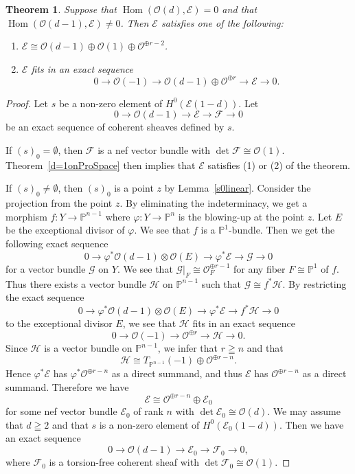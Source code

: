 \documentclass[a4paper,12pt]{amsart}
\newtheorem{thm}{Theorem}[section]
\DeclareMathOperator{\Hom}{Hom}
\begin{document}
\begin{thm}\label{oneO(d-1)}
Suppose that $\Hom(\mathcal{O}(d),\mathcal{E})=0$
and that $\Hom(\mathcal{O}(d-1),\mathcal{E})\neq 0$.
Then $\mathcal{E}$ satisfies one of the following:
\begin{enumerate}
\item $\mathcal{E}\cong \mathcal{O}(d-1)\oplus \mathcal{O}(1)\oplus \mathcal{O}^{\oplus r-2}$.
\item $\mathcal{E}$ fits in an exact sequence
\[
0\to \mathcal{O}(-1)\to \mathcal{O}(d-1)\oplus \mathcal{O}^{\oplus r}\to \mathcal{E}\to 0.
\]
\end{enumerate}
\end{thm}
\begin{proof}
Let $s$ be a non-zero element of $H^0(\mathcal{E}(1-d))$.
Let 
\[0\to \mathcal{O}(d-1)\to \mathcal{E}\to \mathcal{F}\to 0\]
be an exact sequence of coherent sheaves
defined by $s$.

If $(s)_0=\emptyset$, then $\mathcal{F}$ is a nef vector bundle with $\det\mathcal{F}\cong \mathcal{O}(1)$.
Theorem~\ref{d=1onProSpace} then implies that $\mathcal{E}$ satisfies (1) or (2) of the theorem.

If $(s)_0\neq \emptyset$, then $(s)_0$ is a point $z$ by Lemma~\ref{s0linear}.
Consider the projection from 
the point $z$.
By eliminating the indeterminacy, we get a morphism $f:Y\to \mathbb{P}^{n-1}$ where $\varphi:Y\to \mathbb{P}^n$
is the blowing-up 
at the point $z$.
Let $E$ be the exceptional divisor of $\varphi$.
We see that $f$ is a $\mathbb{P}^{1}$-bundle.
Then we get the following exact sequence
\[0\to\varphi^*\mathcal{O}(d-1)\otimes\mathcal{O}(E)\to \varphi^*\mathcal{E}\to \mathcal{G}\to 0\]
for a vector bundle $\mathcal{G}$ on $Y$.
We see that $\mathcal{G}|_F\cong \mathcal{O}_F^{\oplus r-1}$ for any fiber $F\cong \mathbb{P}^{1}$ of $f$.
Thus there exists a vector bundle $\mathcal{H}$ on $\mathbb{P}^{n-1}$ such that $\mathcal{G}\cong f^*\mathcal{H}$.
By restricting the exact sequence
\[0\to\varphi^*\mathcal{O}(d-1)\otimes\mathcal{O}(E)\to \varphi^*\mathcal{E}\to f^*\mathcal{H}\to 0\]
to the exceptional divisor $E$, we see that $\mathcal{H}$ fits in an exact sequence
\[0\to \mathcal{O}(-1)\to \mathcal{O}^{\oplus r}\to \mathcal{H}\to 0.
\]
Since $\mathcal{H}$ is a vector bundle on $\mathbb{P}^{n-1}$, 
we infer that $r\geqq n$ and that 
\[\mathcal{H}\cong T_{\mathbb{P}^{n-1}}(-1)\oplus \mathcal{O}^{\oplus r-n}.\]
Hence $\varphi^*\mathcal{E}$ has $\varphi^*\mathcal{O}^{\oplus r-n}$ as a direct summand,
and thus $\mathcal{E}$ has $\mathcal{O}^{\oplus r-n}$ as a direct summand. Therefore we have
\[\mathcal{E}\cong \mathcal{O}^{\oplus r-n}\oplus \mathcal{E}_0\]
for some nef vector bundle $\mathcal{E}_0$
of rank $n$ with $\det \mathcal{E}_0\cong \mathcal{O}(d)$.
We may assume that $d\geqq 2$ and that $s$ is a non-zero element of $H^0(\mathcal{E}_0(1-d))$.
Then we have an exact sequence
\[0\to \mathcal{O}(d-1)\to \mathcal{E}_0\to \mathcal{F}_0\to 0,\]
where $\mathcal{F}_0$ is a torsion-free coherent sheaf with $\det \mathcal{F}_0\cong \mathcal{O}(1)$.


\end{proof}
\end{document}
